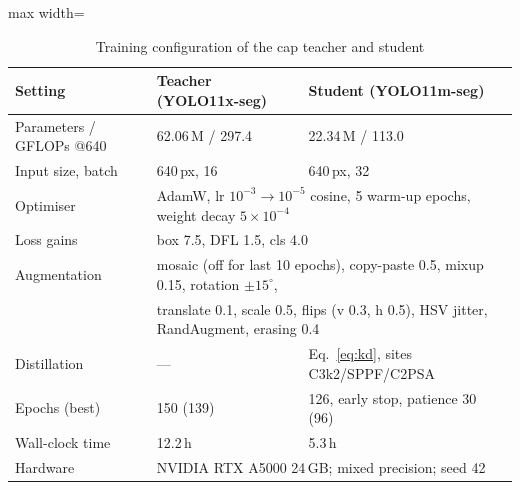\begin{table}[htbp]
\centering
\caption{Training configuration of the cap teacher and student}
\label{tab:train-config}
\footnotesize
\begin{adjustbox}{max width=\textwidth}
\begin{tabular}{|l|l|l|}
\hline
\textbf{Setting} & \textbf{Teacher (YOLO11x-seg)} & \textbf{Student (YOLO11m-seg)} \\ \hline
Parameters / GFLOPs @640 & 62.06\,M / 297.4 & 22.34\,M / 113.0 \\ \hline
Input size, batch & 640\,px, 16 & 640\,px, 32 \\ \hline
Optimiser & \multicolumn{2}{l|}{AdamW, lr $10^{-3}\rightarrow10^{-5}$ cosine, 5 warm-up epochs, weight decay $5{\times}10^{-4}$} \\ \hline
Loss gains & \multicolumn{2}{l|}{box 7.5, DFL 1.5, cls 4.0} \\ \hline
Augmentation & \multicolumn{2}{l|}{mosaic (off for last 10 epochs), copy-paste 0.5, mixup 0.15, rotation $\pm15^\circ$,} \\
 & \multicolumn{2}{l|}{translate 0.1, scale 0.5, flips (v 0.3, h 0.5), HSV jitter, RandAugment, erasing 0.4} \\ \hline
Distillation & --- & Eq.~\eqref{eq:kd}, sites C3k2/SPPF/C2PSA \\ \hline
Epochs (best) & 150 (139) & 126, early stop, patience 30 (96) \\ \hline
Wall-clock time & 12.2\,h & 5.3\,h \\ \hline
Hardware & \multicolumn{2}{l|}{NVIDIA RTX A5000 24\,GB; mixed precision; seed 42} \\ \hline
\end{tabular}
\end{adjustbox}
\end{table}

